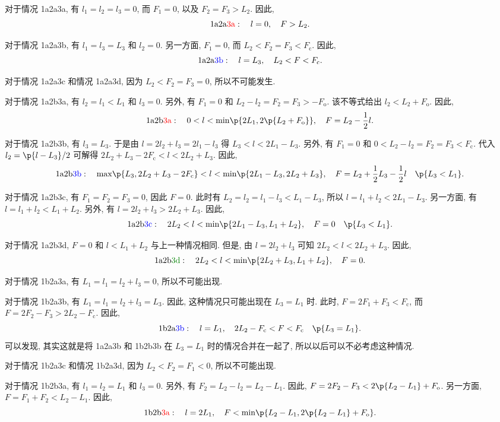 \documentclass{article}
\newcommand{\mrm}[1]{\mathrm{#1}}
\newcommand{\fr}{\frac}
\newcommand{\opn}{\operatorname}
\newcommand{\fc}[2]{#1\mathchoice{\!}{\!}{}{}\p{#2}} %
\newcommand{\opc}[2]{\fc{\opn{#1}}{#2}} %
\begin{document}
对于情况 1a2a{\color{red}3a}, 有 $l_1=l_2=l_3=0$,
而 $F_1=0$, 以及 $F_2=F_3>L_2$.
因此,
\[\mrm{1a2a\color{red}3a}:\quad l=0,\quad F>L_2.\]

对于情况 1a2a{\color{blue}3b}, 有 $l_1=l_3=L_3$ 和 $l_2=0$.
另一方面, $F_1=0$, 而 $L_2<F_2=F_3<F_\mrm c$.
因此,
\[\mrm{1a2a\color{blue}3b}:\quad l=L_3,\quad L_2<F<F_\mrm c.\]

对于情况 1a2a{\color{blue}3c}
和情况 1a2a{\color{green!50!black}3d},
因为 $L_2<F_2=F_3=0$, 所以不可能发生.

对于情况 1a2b{\color{red}3a}, 有 $l_2=l_1<L_1$ 和 $l_3=0$.
另外, 有 $F_1=0$ 和 $L_2-l_2=F_2=F_3>-F_\mrm o$.
该不等式给出 $l_2<L_2+F_\mrm o$.
因此,
\[\mrm{1a2b\color{red}3a}:\quad
0<l<\opc{min}{2L_1,2\p{L_2+F_\mrm o}},\quad
F=L_2-\fr12l.\]

对于情况 1a2b{\color{blue}3b}, 有 $l_3=L_3$.
于是由 $l=2l_2+l_3=2l_1-l_3$ 得 $L_3<l<2L_1-L_3$.
另外, 有 $F_1=0$ 和 $0<L_2-l_2=F_2=F_3<F_\mrm c$.
代入 $l_2=\p{l-L_3}/2$ 可解得
$2L_2+L_3-2F_\mrm c<l<2L_2+L_3$.
因此,
\[\mrm{1a2b\color{blue}3b}:\quad
\opc{max}{L_3,2L_2+L_3-2F_\mrm c}<l<\opc{min}{2L_1-L_3,2L_2+L_3},\quad
F=L_2+\fr12L_3-\fr12l\quad\p{L_3<L_1}.\]

对于情况 1a2b{\color{blue}3c},
有 $F_1=F_2=F_3=0$, 因此 $F=0$.
此时有 $L_2=l_2=l_1-l_3<L_1-L_3$, 所以 $l=l_1+l_2<2L_1-L_3$.
另一方面, 有 $l=l_1+l_2<L_1+L_2$.
另外, 有 $l=2l_2+l_3>2L_2+L_3$.
因此,
\[\mrm{1a2b\color{blue}3c}:\quad
2L_2<l<\opc{min}{2L_1-L_3,L_1+L_2},\quad F=0\quad\p{L_3<L_1}.\]

对于情况 1a2b{\color{green!50!black}3d},
$F=0$ 和 $l<L_1+L_2$ 与上一种情况相同.
但是, 由 $l=2l_2+l_3$ 可知 $2L_2<l<2L_2+L_3$.
因此,
\[\mrm{1a2b\color{green!50!black}3d}:\quad
2L_2<l<\opc{min}{2L_2+L_3,L_1+L_2},\quad F=0.\]

对于情况 1b2a{\color{red}3a}, 有 $L_1=l_1=l_2+l_3=0$, 所以不可能出现.

对于情况 1b2a{\color{blue}3b}, 有 $L_1=l_1=l_2+l_3=L_3$.
因此, 这种情况只可能出现在 $L_3=L_1$ 时.
此时, $F=2F_1+F_3<F_\mrm c$,
而 $F=2F_2-F_3>2L_2-F_\mrm c$.
因此,
\[\mrm{1b2a\color{blue}3b}:\quad
l=L_1,\quad
2L_2-F_\mrm c<F<F_\mrm c\quad\p{L_3=L_1}.\]
可以发现, 其实这就是将 1a2a{\color{blue}3b} 和 1b2b{\color{blue}3b}
在 $L_3=L_1$ 时的情况合并在一起了,
所以以后可以不必考虑这种情况.

对于情况 1b2a{\color{blue}3c}
和情况 1b2a{\color{green!50!black}3d},
因为 $L_2<F_2=F_1<0$, 所以不可能出现.

对于情况 1b2b{\color{red}3a}, 有 $l_1=l_2=L_1$ 和 $l_3=0$.
另外, 有 $F_2=L_2-l_2=L_2-L_1$.
因此, $F=2F_2-F_3<2\p{L_2-L_1}+F_\mrm o$.
另一方面, $F=F_1+F_2<L_2-L_1$.
因此,
\[\mrm{1b2b\color{red}3a}:\quad
l=2L_1,\quad F<\opc{min}{L_2-L_1,2\p{L_2-L_1}+F_\mrm o}.\]
\end{document}
